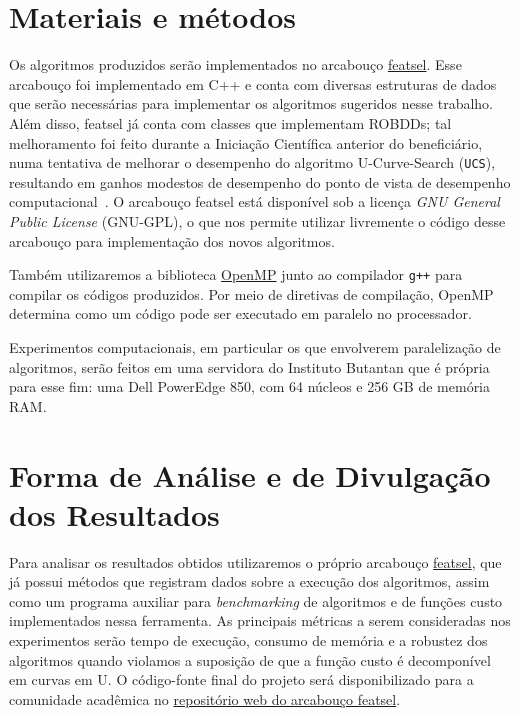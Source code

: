 \documentclass[12pt]{article}
\begin{document}
\section{Materiais e métodos}
Os algoritmos produzidos serão implementados no arcabouço 
\href{https://github.com/msreis/featsel}{featsel}. Esse arcabouço foi 
implementado em C++ e conta com diversas estruturas de dados que serão necessárias para implementar os
algoritmos sugeridos nesse trabalho. Além disso, featsel já conta com classes que implementam ROBDDs; tal melhoramento foi feito durante a Iniciação Científica anterior do beneficiário, numa tentativa de melhorar o desempenho do algoritmo U-Curve-Search ({\tt UCS}), resultando em ganhos modestos de desempenho do ponto de vista de desempenho computacional~\cite{ucsrobdd ic}. O arcabouço featsel está disponível sob a licença \textit{GNU General Public License} (GNU-GPL), o que nos permite utilizar livremente o código desse arcabouço para implementação dos novos algoritmos. 

Também utilizaremos a biblioteca \href{http://www.openmp.org/}{OpenMP} junto ao compilador {\tt g++} para compilar os códigos produzidos. Por meio de diretivas de compilação, OpenMP determina como um código pode ser executado em paralelo no processador.

Experimentos computacionais, em particular os que envolverem paralelização de algoritmos, serão feitos em uma servidora do Instituto Butantan que é própria para esse fim: uma Dell PowerEdge 850, com 64 núcleos e 256 GB de memória RAM.


\section{Forma de Análise e de Divulgação dos Resultados}

Para analisar os resultados obtidos utilizaremos o próprio arcabouço \href{https://github.com/msreis/featsel}{featsel}, que já possui métodos que registram dados sobre a execução dos algoritmos, assim como um programa auxiliar para {\em benchmarking} de algoritmos e de funções custo implementados nessa ferramenta. As principais métricas a serem consideradas nos experimentos serão tempo de execução, consumo de memória e a robustez dos algoritmos quando violamos a suposição de que a função custo é decomponível em curvas em U. O código-fonte final do projeto será disponibilizado para a comunidade acadêmica no \href{https://github.com/msreis/featsel}{repositório web do arcabouço featsel}.
\end{document}
